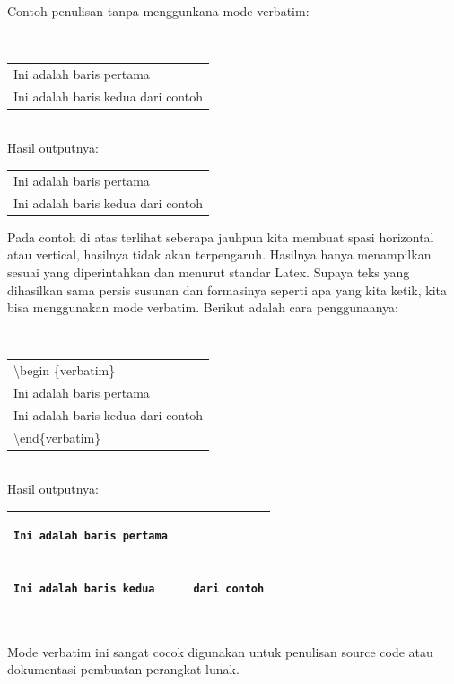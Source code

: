 \begin{raggedleft}Contoh penulisan tanpa menggunkana mode verbatim:\end{raggedleft}\\
\begin{tabular}{|p{13.5 cm}|}
\hline
Ini adalah baris pertama \\[0.5 cm]


Ini adalah baris kedua     \hspace{0.5 cm}   dari contoh\\
\hline
\end{tabular}\\[0.5 cm]
\vspace{0.5 cm}
Hasil outputnya:\\
\begin{tabular}{|p{13.5 cm}|}
\hline
Ini adalah baris pertama \\


Ini adalah baris kedua  dari contoh\\
\hline
\end{tabular}\vspace{0.5 cm}
\begin{raggedleft}
Pada contoh di atas terlihat seberapa jauhpun kita membuat spasi horizontal atau vertical, hasilnya tidak akan terpengaruh. Hasilnya hanya menampilkan sesuai yang diperintahkan dan menurut standar Latex. Supaya teks yang dihasilkan sama persis susunan dan formasinya seperti apa yang kita ketik, kita bisa menggunakan mode verbatim. Berikut adalah cara penggunaanya:\end{raggedleft} \\[0.5 cm]
\begin{tabular}{|p{13.5 cm}|}
\hline
\textbackslash begin \{verbatim\}\\
Ini adalah baris pertama \\[0.5 cm]


Ini adalah baris kedua     \hspace{0.5 cm}   dari contoh\\
\textbackslash end\{verbatim\} \\
\hline
\end{tabular}\\[0.5 cm]
Hasil outputnya: \\[0.5 cm]
\vspace{0.5 cm}
\begin{tabular}{|p{13.5 cm}|}
\hline
\begin {verbatim}
Ini adalah baris pertama 


Ini adalah baris kedua      dari contoh
\end{verbatim} \\
\hline
\end{tabular}\\[0.5 cm]
Mode verbatim ini sangat cocok digunakan untuk penulisan source code atau dokumentasi pembuatan perangkat lunak.
